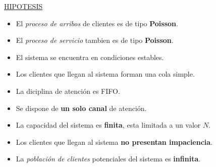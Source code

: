\documentclass{article}
\begin{document}
\noindent
\underline{HIPOTESIS}
\begin{itemize}
    \item El \textit{proceso de arribos} de clientes es de tipo \textbf{Poisson}.
    \item El \textit{proceso de servicio} tambien es de tipo \textbf{Poisson}.
    \item El sistema se encuentra en condiciones estables.
    \item Los clientes que llegan al sistema forman una cola simple.
    \item La diciplina de atención es FIFO.
    \item Se dispone de \textbf{un solo canal} de atención.
    \item La capacidad del sistema es \textbf{finita}, esta limitada a un valor \(N\).
    \item Los clientes que llegan al sistema \textbf{no presentan impaciencia}.
    \item La \textit{población de clientes} potenciales del sistema es \textbf{infinita}.
\end{itemize}
\end{document}
